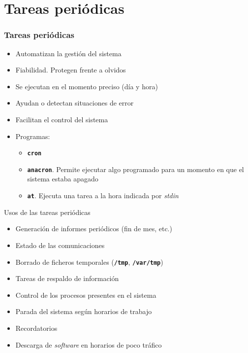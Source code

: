 \documentclass[ucs]{beamer}
\begin{document}


  \section{Tareas periódicas}

\begin{frame}[fragile]
  \frametitle{Tareas periódicas}

  \begin{itemize}
  \item Automatizan la gestión del sistema
  \item Fiabilidad. Protegen frente a olvidos 
  \item Se ejecutan en el momento preciso (día y hora)
  \item Ayudan o detectan situaciones de error
  \item Facilitan el control del sistema
  \item Programas: 
\begin{itemize}
\item
\texttt{\textbf{cron}} 
\item
\texttt{\textbf{anacron}}.
Permite ejecutar algo programado para un momento
en que el sistema estaba apagado
\item
\texttt{\textbf{at}}.
Ejecuta una tarea a la hora indicada por \emph{stdin}
\end{itemize}
  \end{itemize}
\end{frame}


\begin{frame}[fragile]
Usos de las tareas periódicas

  \begin{itemize}
  \item Generación de informes periódicos (fin de mes, etc.)
  \item Estado de las comunicaciones
  \item Borrado de ficheros temporales (\texttt{\textbf{/tmp}},
    \texttt{\textbf{/var/tmp}})
  \item Tareas de respaldo de información
  \item Control de los procesos presentes en el sistema
  \item Parada del sistema según horarios de trabajo
  \item Recordatorios
  \item Descarga de \emph{software} en horarios de poco tráfico
  \end{itemize}
\end{frame}
\end{document}
